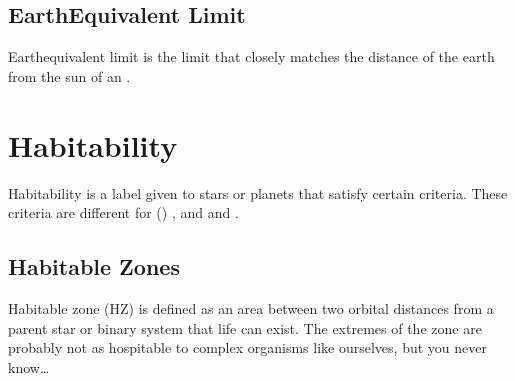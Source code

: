 \documentclass[letterpaper,10pt,english]{sphinxmanual}
\begin{document}
\subsection{Earth\sphinxhyphen{}Equivalent Limit}
\label{\detokenize{quantities/insolation_models/earth_equivalent_limit:earth-equivalent-limit}}\label{\detokenize{quantities/insolation_models/earth_equivalent_limit::doc}}\label{\detokenize{quantities/insolation_models/earth_equivalent_limit:id1}}
\sphinxAtStartPar
Earth\sphinxhyphen{}equivalent limit is the limit that closely matches the distance of the earth
from the sun of an {\hyperref[\detokenize{quantities/insolation_models/insolation_models:id1}]{}}.


\section{Habitability}
\label{\detokenize{quantities/habitability/habitability:habitability}}\label{\detokenize{quantities/habitability/habitability::doc}}\label{\detokenize{quantities/habitability/habitability:id1}}
\sphinxAtStartPar
Habitability is a label given to stars or planets that satisfy certain criteria.
These criteria are different for ({\hyperref[\detokenize{celestial_systems/binary_system:id1}]{}}) {\hyperref[\detokenize{celestial_bodies/star:id1}]{}},
{\hyperref[\detokenize{celestial_bodies/planet:id1}]{}} and {\hyperref[\detokenize{celestial_bodies/satellite:id1}]{}} and {\hyperref[\detokenize{celestial_bodies/trojan_satellite:id1}]{}}.


\subsection{Habitable Zones}
\label{\detokenize{quantities/habitability/habitable_zones/habitable_zones:habitable-zones}}\label{\detokenize{quantities/habitability/habitable_zones/habitable_zones::doc}}\label{\detokenize{quantities/habitability/habitable_zones/habitable_zones:id1}}
\sphinxAtStartPar
Habitable zone (HZ) is defined as an area between two orbital distances from a parent star or binary system
that life can exist. The extremes of the zone are probably not as hospitable to complex organisms
like ourselves, but you never know…
\end{document}
